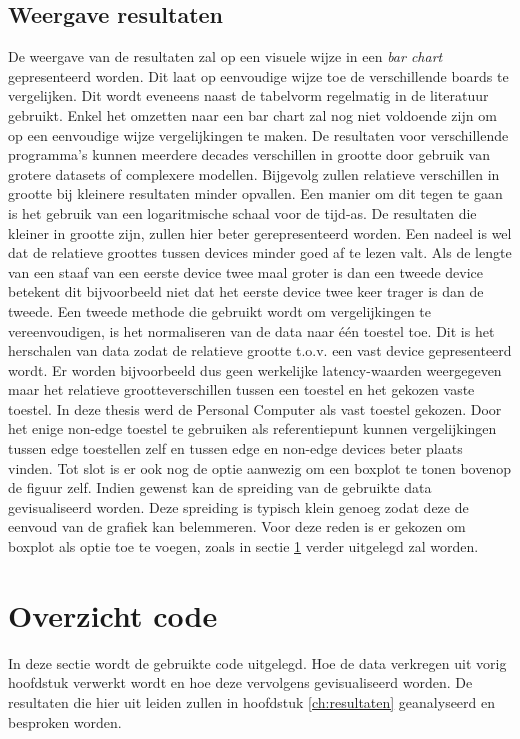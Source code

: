 	\subsection{Weergave resultaten}
	De weergave van de resultaten zal op een visuele wijze in een \textit{bar chart} gepresenteerd worden. Dit laat op eenvoudige wijze toe de verschillende boards te vergelijken. Dit wordt eveneens naast de tabelvorm regelmatig in de literatuur gebruikt. Enkel het omzetten naar een bar chart zal nog niet voldoende zijn om op een eenvoudige wijze vergelijkingen te maken. De resultaten voor verschillende programma's kunnen meerdere decades verschillen in grootte door gebruik van grotere datasets of complexere modellen. Bijgevolg zullen relatieve verschillen in grootte bij kleinere resultaten minder opvallen. Een manier om dit tegen te gaan is het gebruik van een logaritmische schaal voor de tijd-as. De resultaten die kleiner in grootte zijn, zullen hier beter gerepresenteerd worden. Een nadeel is wel dat de relatieve groottes tussen devices minder goed af te lezen valt. Als de lengte van een staaf van een eerste device twee maal groter is dan een tweede device betekent dit bijvoorbeeld niet dat het eerste device twee keer trager is dan de tweede. Een tweede methode die gebruikt wordt om vergelijkingen te vereenvoudigen, is het normaliseren van de data naar \'e\'en toestel toe. Dit is het herschalen van data zodat de relatieve grootte t.o.v. een vast device gepresenteerd wordt. Er worden bijvoorbeeld dus geen werkelijke latency-waarden weergegeven maar het relatieve grootteverschillen tussen een toestel en het gekozen vaste toestel. In deze thesis werd de Personal Computer als vast toestel gekozen. Door het enige non-edge toestel te gebruiken als referentiepunt kunnen vergelijkingen tussen edge toestellen zelf en tussen edge en non-edge devices beter plaats vinden. Tot slot is er ook nog de optie aanwezig om een boxplot te tonen bovenop de figuur zelf. Indien gewenst kan de spreiding van de gebruikte data gevisualiseerd worden. Deze spreiding is typisch klein genoeg zodat deze de eenvoud van de grafiek kan belemmeren. Voor deze reden is er gekozen om boxplot als optie toe te voegen, zoals in sectie \ref{sec:plotresultscode} verder uitgelegd zal worden. 
	
\section{Overzicht code} \label{sec:plotresultscode}
In deze sectie wordt de gebruikte code uitgelegd. Hoe de data verkregen uit vorig hoofdstuk verwerkt wordt en hoe deze vervolgens gevisualiseerd worden. De resultaten die hier uit leiden zullen in hoofdstuk \ref{ch:resultaten} geanalyseerd en besproken worden. 

